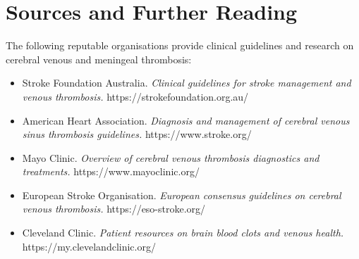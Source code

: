 \section*{Sources and Further Reading}
The following reputable organisations provide clinical guidelines and research on cerebral venous and meningeal thrombosis:
\begin{itemize}
    \item Stroke Foundation Australia. \textit{Clinical guidelines for stroke management and venous thrombosis.} https://strokefoundation.org.au/
    \item American Heart Association. \textit{Diagnosis and management of cerebral venous sinus thrombosis guidelines.} https://www.stroke.org/
    \item Mayo Clinic. \textit{Overview of cerebral venous thrombosis diagnostics and treatments.} https://www.mayoclinic.org/
    \item European Stroke Organisation. \textit{European consensus guidelines on cerebral venous thrombosis.} https://eso-stroke.org/
    \item Cleveland Clinic. \textit{Patient resources on brain blood clots and venous health.} https://my.clevelandclinic.org/
\end{itemize}
